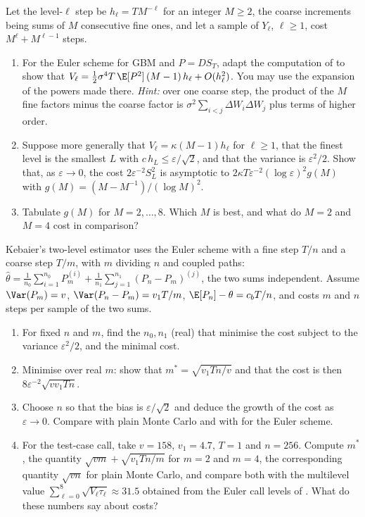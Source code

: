 \begin{exercise}\label{ex:ml-refinement}
\medium Let the level-$\ell$ step be $h_\ell=TM^{-\ell}$ for an integer $M\ge2$, the coarse increments
being sums of $M$ consecutive fine ones, and let a sample of $Y_\ell$, $\ell\ge1$, cost
$M^\ell+M^{\ell-1}$ steps.
\begin{enumerate}[label=(\alph*)]
  \item For the Euler scheme for GBM and $P=DS_T$, adapt the computation of
     to show that $V_\ell=\frac12\sigma^4T\,\E[P^2]\,(M-1)\,h_\ell+O(h_\ell^2)$.
    You may use the expansion of the powers made there. \emph{Hint:} over one coarse step, the
    product of the $M$ fine factors minus the coarse factor is
    $\sigma^2\sum_{i<j}\Delta W_i\Delta W_j$ plus terms of higher order.
  \item Suppose more generally that $V_\ell=\kappa(M-1)h_\ell$ for $\ell\ge1$, that the finest level is
    the smallest $L$ with $c\,h_L\le\varepsilon/\sqrt2$, and that the variance is $\varepsilon^2/2$.
    Show that, as $\varepsilon\to0$, the cost $2\varepsilon^{-2}S_L^2$ is asymptotic to
    $2\kappa T\varepsilon^{-2}(\log\varepsilon)^2g(M)$ with $g(M)=(M-M^{-1})/(\log M)^2$.
  \item Tabulate $g(M)$ for $M=2,\dots,8$. Which $M$ is best, and what do $M=2$ and $M=4$ cost in
    comparison?
\end{enumerate}
\end{exercise}

\begin{exercise}\label{ex:ml-kebaier}
\medium Kebaier's two-level estimator uses the Euler scheme with a fine step $T/n$ and a coarse step
$T/m$, with $m$ dividing $n$ and coupled paths:
$\hat\theta=\frac1{n_0}\sum_{i=1}^{n_0}P_m^{(i)}+\frac1{n_1}\sum_{j=1}^{n_1}(P_n-P_m)^{(j)}$, the
two sums independent. Assume $\Var(P_m)=v$, $\Var(P_n-P_m)=v_1T/m$, $\E[P_n]-\theta=c_bT/n$, and
costs $m$ and $n$ steps per sample of the two sums.
\begin{enumerate}[label=(\alph*)]
  \item For fixed $n$ and $m$, find the $n_0,n_1$ (real) that minimise the cost subject to the
    variance $\varepsilon^2/2$, and the minimal cost.
  \item Minimise over real $m$: show that $m^*=\sqrt{v_1Tn/v}$ and that the cost is then
    $8\varepsilon^{-2}\sqrt{vv_1Tn}$.
  \item Choose $n$ so that the bias is $\varepsilon/\sqrt2$ and deduce the growth of the cost as
    $\varepsilon\to0$. Compare with plain Monte Carlo and with  for the
    Euler scheme.
  \item For the test-case call, take $v=158$, $v_1=4.7$, $T=1$ and $n=256$. Compute $m^*$, the
    quantity $\sqrt{vm}+\sqrt{v_1Tn/m}$ for $m=2$ and $m=4$, the corresponding quantity
    $\sqrt{vn}$ for plain Monte Carlo, and compare both with the multilevel value
    $\sum_{\ell=0}^8\sqrt{V_\ell\tau_\ell}\approx31.5$ obtained from the Euler call levels of
    . What do these numbers say about costs?
\end{enumerate}
\end{exercise}

